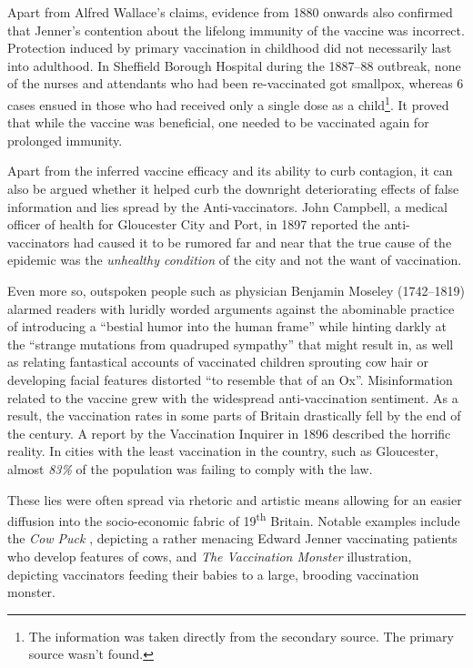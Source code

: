 \documentclass{article}
\begin{document}
Apart from Alfred Wallace's claims, evidence from 1880 onwards also confirmed
that Jenner's contention about the lifelong immunity of the vaccine was
incorrect\citep{colin_r}. Protection induced by primary vaccination in
childhood did not necessarily last into adulthood. In Sheffield Borough
Hospital during the 1887–88 outbreak, none of the nurses and attendants who had
been re-vaccinated got smallpox, whereas 6 cases ensued in those who had
received only a single dose as a child\footnote{The information was taken
    directly from the secondary source. The primary source wasn't found.}. It
proved that while the vaccine was beneficial, one needed to be vaccinated again
for prolonged immunity.

Apart from the inferred vaccine efficacy and its ability to curb contagion, it
can also be argued whether it helped curb the downright deteriorating effects
of false information and lies spread by the Anti-vaccinators. John Campbell, a
medical officer of health for Gloucester City and Port, in 1897 reported the
anti-vaccinators had caused it to be rumored far and near that the true cause
of the epidemic was the \textit{unhealthy condition} of the city and not the
want of vaccination\citep{faherty}.

Even more so, outspoken people such as physician Benjamin Moseley (1742--1819)
alarmed readers with luridly worded arguments against the abominable practice
of introducing a ``bestial humor into the human frame'' while hinting darkly at
the ``strange mutations from quadruped sympathy'' that might result in, as well
as relating fantastical accounts of vaccinated children sprouting cow hair or
developing facial features distorted ``to resemble that of an
Ox''\citep{moseley_1807}\citep{the_morgan_library}. Misinformation related to
the vaccine grew with the widespread anti-vaccination sentiment. As a result,
the vaccination rates in some parts of Britain drastically fell by the end of
the century. A report by the Vaccination Inquirer in 1896 described the
horrific reality. In cities with the least vaccination in the country, such as
Gloucester, almost \textit{83\%} of the population was failing to comply with
the law\citep{faherty}.

These lies were often spread via rhetoric and artistic means allowing for an
easier diffusion into the socio-economic fabric of 19\textsuperscript{th}
Britain. Notable examples include the \textit{Cow Puck} \citep{gillray_1802},
depicting a rather menacing Edward Jenner vaccinating patients who develop
features of cows, and \textit{The Vaccination Monster}
illustration\citep{williams_1802}, depicting vaccinators feeding their babies
to a large, brooding vaccination monster.
\end{document}

